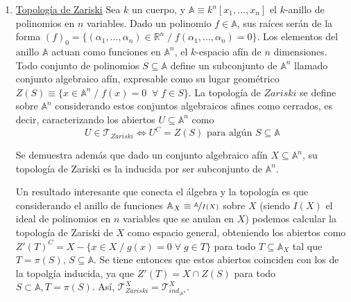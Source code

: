 \documentclass[12pt,twoside]{report}
\newcommand\mc[1]{\mathcal{#1}}
\theoremstyle{azul}
\theoremstyle{azul2}
\theoremstyle{plain}
\theoremstyle{definition}
\theoremstyle{remark}
\newtheorem*{obs}{Observación}
\begin{document}
\begin{enumerate}
    Más información sobre esta topología en \textcolor{blue}{\href{https://en.wikipedia.org/wiki/Lower_limit_topology}{Wikipedia}}.
    \begin{obs}
    Estas tres topologías en $\mathbb{R}$ son, por tanto, comparables, teniendo que
    $$\mc{T}_{K} \subset \mc{T}_{usual} \subset \mc{T}_{inf}$$
    \end{obs}
    \item \underline{Topología de Zariski} \label{topz}
    \justifying
     Sea $k$ un cuerpo, y $\mathbb{A} \equiv k^n[x_1, \ldots, x_n]$ el $k$-anillo de polinomios en $n$ variables. Dado un polinomio $f \in \mathbb{A}$, sus raíces serán de la forma $(f)_0=\{(\alpha_1, \ldots, \alpha_n) \in \mathbb{R}^n \; / \; f(\alpha_1, \ldots, \alpha_n) = 0\}$. Los elementos del anillo $\mathbb{A}$ actuan como funciones en $\mathbb{A}^n$, el $k$-espacio afín de $n$ dimensiones. Todo conjunto de polinomios $S \subseteq \mathbb{A}$ define un subconjunto de $\mathbb{A}^n$ llamado conjunto algebraico afín, expresable como su lugar geométrico $Z(S) \equiv \{x \in \mathbb{A}^n \; / \; f(x) = 0 \; \; \forall \; f \in S\}$. La topología de $Zariski$ se define sobre $\mathbb{A}^n$ considerando estos conjuntos algebraicos afines como cerrados, es decir, caracterizando los abiertos $U\subseteq \mathbb{A}^n$ como
        $$U \in \mc{T}_{Zariski} \iff U^C = Z(S) \text{ para algún } S\subseteq \mathbb{A}$$
    
    Se demuestra además que dado un conjunto algebraico afín $X \subseteq \mathbb{A}^n$, su topología de Zariski es la inducida por ser subconjunto de $\mathbb{A}^n$. 
    
    Un resultado interesante que conecta el álgebra y la topología es que considerando el anillo de funciones $\mathbb{A}_X \equiv \displaystyle \nicefrac{\mathbb{A}}{I(X)}$ sobre $X$ (siendo $I(X)$ el ideal de polinomios en $n$ variables que se anulan en $X$) podemos calcular la topología de Zariski de $X$ como espacio general, obteniendo los abiertos como $Z'(T)^C = X - \{x \in X \;/\; g(x)=0 \;\forall\; g\in T\}$ para todo $T \subseteq \mathbb{A}_X$ tal que $T = \pi(S), \,S\subseteq \mathbb{A}$. Se tiene entonces que estos abiertos coinciden con los de la topolgía inducida, ya que $Z'(T) = X \cap Z(S)$ para todo $S \subset \mathbb{A}, T=\pi(S)$. Así, $\mathcal{T}_{Zariski}^X = \mathcal{T}^X_{{ind}_{| \mathbb{A}^n}}$.
\end{enumerate}
\end{document}
